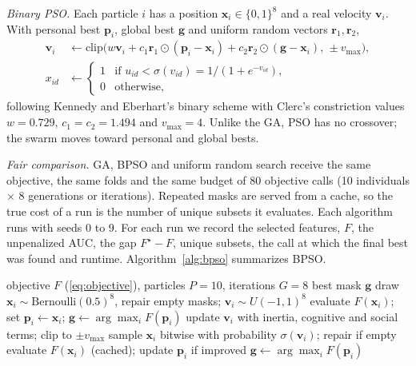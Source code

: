 \documentclass[conference]{IEEEtran}
\begin{document}
\textit{Binary PSO.} Each particle $i$ has a position $\mathbf{x}_i\in\{0,1\}^8$ and a real velocity $\mathbf{v}_i$. With personal best $\mathbf{p}_i$, global best $\mathbf{g}$ and uniform random vectors $\mathbf{r}_1,\mathbf{r}_2$,
\begin{align}
\mathbf{v}_i &\leftarrow \mathrm{clip}\bigl(w\mathbf{v}_i+c_1\mathbf{r}_1\odot(\mathbf{p}_i-\mathbf{x}_i)+c_2\mathbf{r}_2\odot(\mathbf{g}-\mathbf{x}_i),\,\pm v_{\max}\bigr),\\
x_{id} &\leftarrow \begin{cases}1 & \text{if } u_{id}<\sigma(v_{id})=1/(1+e^{-v_{id}}),\\ 0 & \text{otherwise,}\end{cases}
\end{align}
following Kennedy and Eberhart's binary scheme \cite{kennedy1997} with Clerc's constriction values $w=0.729$, $c_1=c_2=1.494$ \cite{clerc2002} and $v_{\max}=4$. Unlike the GA, PSO has no crossover; the swarm moves toward personal and global bests.

\textit{Fair comparison.} GA, BPSO and uniform random search receive the same objective, the same folds and the same budget of 80 objective calls (10 individuals $\times$ 8 generations or iterations). Repeated masks are served from a cache, so the true cost of a run is the number of unique subsets it evaluates. Each algorithm runs with seeds 0 to 9. For each run we record the selected features, $F$, the unpenalized AUC, the gap $F^\star-F$, unique subsets, the call at which the final best was found and runtime. Algorithm~\ref{alg:bpso} summarizes BPSO.

\begin{algorithm}[!tb]
\caption{Binary PSO for raw-column subset selection}
\label{alg:bpso}
\footnotesize
\begin{algorithmic}[1]
\REQUIRE objective $F$ (\ref{eq:objective}), particles $P=10$, iterations $G=8$
\ENSURE best mask $\mathbf{g}$
\STATE draw $\mathbf{x}_i\sim\mathrm{Bernoulli}(0.5)^8$, repair empty masks; $\mathbf{v}_i\sim U(-1,1)^8$
\STATE evaluate $F(\mathbf{x}_i)$; set $\mathbf{p}_i\leftarrow\mathbf{x}_i$; $\mathbf{g}\leftarrow\arg\max_i F(\mathbf{p}_i)$
    \STATE update $\mathbf{v}_i$ with inertia, cognitive and social terms; clip to $\pm v_{\max}$
    \STATE sample $\mathbf{x}_i$ bitwise with probability $\sigma(\mathbf{v}_i)$; repair if empty
    \STATE evaluate $F(\mathbf{x}_i)$ (cached); update $\mathbf{p}_i$ if improved
  \ENDFOR
  \STATE $\mathbf{g}\leftarrow\arg\max_i F(\mathbf{p}_i)$
\ENDFOR
\end{algorithmic}
\end{algorithm}
\end{document}
